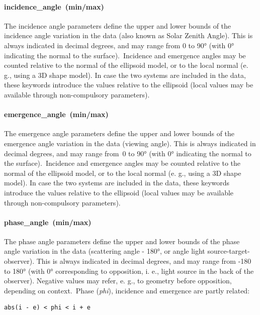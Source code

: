 \documentclass[11pt,a4paper]{ivoa}
\begin{document}
\paragraph{incidence\_angle (min/max)}

The incidence angle parameters define the upper and lower bounds of the incidence angle variation in the data (also known as Solar Zenith Angle). This is always indicated in decimal degrees, and may range from 0 to 90° (with 0° indicating the normal to the surface). Incidence and emergence angles may be counted relative to the normal of the ellipsoid model, or to the local normal (e. g., using a 3D shape model). In case the two systems are included in the data, these keywords introduce the values relative to the ellipsoid (local values may be available through non-compulsory parameters).

\paragraph{emergence\_angle (min/max)}

The emergence angle parameters define the upper and lower bounds of the emergence angle variation in the data (viewing angle). This is always indicated in decimal degrees, and may range from 0 to 90° (with 0° indicating the normal to the surface). Incidence and emergence angles may be counted relative to the normal of the ellipsoid model, or to the local normal (e. g., using a 3D shape model). In case the two systems are included in the data, these keywords introduce the values relative to the ellipsoid (local values may be available through non-compulsory parameters).

\paragraph{phase\_angle (min/max)}

The phase angle parameters define the upper and lower bounds of the phase angle variation in the data (scattering angle - 180°, or angle light source-target-observer). This is always indicated in decimal degrees, and may range from -180 to 180° (with 0° corresponding to opposition, i. e., light source in the back of the observer). Negative values may refer, e. g., to geometry before opposition, depending on context. Phase (\emph{phi}), incidence and emergence are partly related:






\begin{verbatim}abs(i - e) < phi < i + e\end{verbatim}
\end{document}
